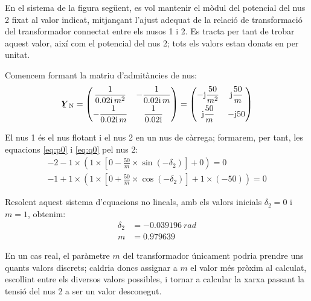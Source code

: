 \begin{exemple}
    En el sistema de la figura següent, es vol mantenir el mòdul del
    potencial del nus 2 fixat al valor indicat, mitjançant l'ajust
    adequat de la relació de transformació del transformador connectat
    entre els nusos 1 i 2. Es tracta per tant de trobar aquest valor,
    així com el potencial del nus 2; tots els valors estan donats en
    per unitat.

    \begin{center}
        
    \end{center}

    Comencem formant la matriu d'admitàncies de nus:
    \[
    \mcmplx{Y}\ped{N} = \begin{pmatrix}
    \dfrac{1}{\complexnum{j0,02} \,m^2}  &  -\dfrac{1}{\complexnum{j0,02} \,m} \\[1.5ex]
    -\dfrac{1}{\complexnum{j0,02}\, m}   & \dfrac{1}{\complexnum{j0,02}}
    \end{pmatrix} =
    \begin{pmatrix}
    -\ju\dfrac{50}{m^2}  &  \ju\dfrac{50}{m} \\[1.5ex]
    \ju\dfrac{50}{m}     & -\ju 50
    \end{pmatrix}
    \]

    El nus 1 és el nus flotant i el nus 2 en un nus de càrrega;
    formarem, per tant,  les equacions \eqref{eq:p0} i \eqref{eq:q0} pel
    nus 2:
    \begin{align*}
    -2 - 1 \times\left( 1 \times\left[ 0 -\frac{50}{m} \times\sin(-\delta_2) \right]  + 0 \right)  = 0   \\[1.5ex]
    -1 + 1 \times\left( 1 \times\left[0 + \frac{50}{m}
    \times\cos(-\delta_2) \right]  + 1\times (-50) \right)  = 0
    \end{align*}

    Resolent aquest sistema d'equacions no lineals, amb els valors
    inicials $\delta_2=0$ i $m=1$, obtenim:
    \begin{align*}
       \delta_2 &= \qty{-0,039196}{rad} \\[1ex]
       m & =\num{0,979639}
    \end{align*}

    En un cas real, el paràmetre $m$ del transformador únicament podria
    prendre uns quants valors discrets; caldria doncs assignar a $m$ el
    valor més pròxim al calculat, escollint entre els diversos valors
    possibles, i tornar a calcular la xarxa passant la tensió del nus
    2 a ser un valor desconegut.
\end{exemple}

